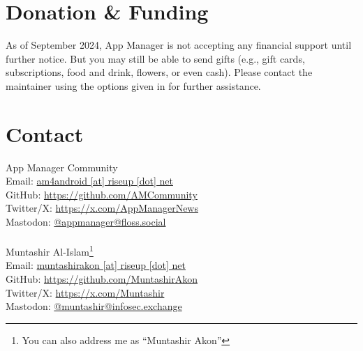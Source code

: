 \section{Donation \& Funding}\label{sec:donation-&-funding} %
%
%
%
%

As of September 2024, App Manager is not accepting any financial support until further notice. But
you may still be able to send gifts (e.g., gift cards, subscriptions, food and drink, flowers, or
even cash). Please contact the maintainer using the options given in  for further
assistance.


\section{Contact}\label{sec:contact} %
App Manager Community\\
Email: \href{mailto:am4android@riseup.net}{am4android [at] riseup [dot] net}\\
GitHub: \url{https://github.com/AMCommunity}\\
Twitter/X: \url{https://x.com/AppManagerNews}\\
Mastodon: \href{https://floss.social/@appmanager}{@appmanager@floss.social}\\
\\

Muntashir Al-Islam\footnote{You can also address me as ``Muntashir Akon''}\\
Email: \href{mailto:muntashirakon@riseup.net}{muntashirakon [at] riseup [dot] net}\\
GitHub: \url{https://github.com/MuntashirAkon}\\
Twitter/X: \url{https://x.com/Muntashir}\\
Mastodon: \href{https://infosec.exchange/@muntashir}{@muntashir@infosec.exchange}

